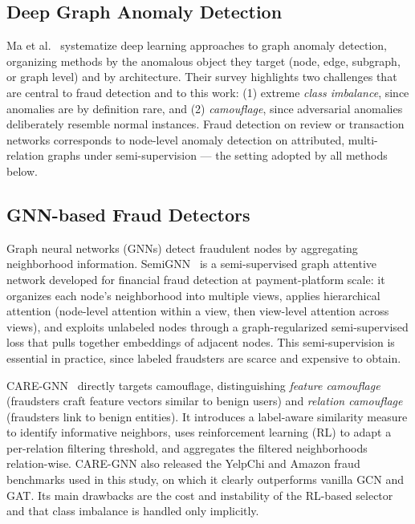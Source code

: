\documentclass[conference]{IEEEtran}
\begin{document}
\subsection{Deep Graph Anomaly Detection}
Ma et al.~\cite{DBLP:journals/tkde/MaWXYZSXA23} systematize deep learning
approaches to graph anomaly detection, organizing methods by the
anomalous object they target (node, edge, subgraph, or graph level) and
by architecture. Their survey highlights two challenges that are central
to fraud detection and to this work: (1) extreme \emph{class imbalance},
since anomalies are by definition rare, and (2) \emph{camouflage}, since
adversarial anomalies deliberately resemble normal instances. Fraud
detection on review or transaction networks corresponds to node-level
anomaly detection on attributed, multi-relation graphs under
semi-supervision --- the setting adopted by all methods below.

\subsection{GNN-based Fraud Detectors}
Graph neural networks (GNNs) detect fraudulent nodes by aggregating
neighborhood information. SemiGNN~\cite{DBLP:conf/icdm/WangQL0JWFYZY19}
is a semi-supervised graph attentive network developed for
financial fraud detection at payment-platform scale: it organizes each
node's neighborhood into multiple views, applies hierarchical attention
(node-level attention within a view, then view-level attention across
views), and exploits unlabeled nodes through a graph-regularized
semi-supervised loss that pulls together embeddings of adjacent nodes.
This semi-supervision is essential in practice, since labeled fraudsters
are scarce and expensive to obtain.

CARE-GNN~\cite{DBLP:conf/cikm/DouL0DPY20} directly targets camouflage,
distinguishing \emph{feature camouflage} (fraudsters craft feature vectors
similar to benign users) and \emph{relation camouflage} (fraudsters link to
benign entities). It introduces a label-aware similarity measure to identify
informative neighbors, uses reinforcement learning (RL) to adapt a
per-relation filtering threshold, and aggregates the filtered neighborhoods
relation-wise. CARE-GNN also released the YelpChi and Amazon fraud
benchmarks used in this study, on which it clearly outperforms vanilla GCN
and GAT. Its main drawbacks are the cost and instability of the RL-based
selector and that class imbalance is handled only implicitly.
\end{document}
